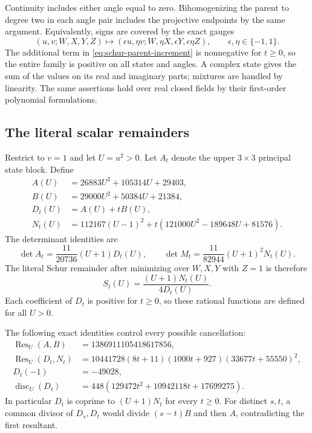 Continuity includes either angle equal to zero. Bihomogenizing the parent
to degree two in each angle pair includes the projective endpoints by the
same argument. Equivalently, signs are covered by the exact gauges
\[
 (u,v;W,X,Y,Z)\longmapsto
 (\epsilon u,\eta v;W,\eta X,\epsilon Y,\epsilon\eta Z),
 \qquad \epsilon,\eta\in\{-1,1\}.
\]
The additional term in \eqref{eq:schur-parent-increment} is nonnegative
for $t\geq0$, so the entire family is positive on all states and angles.
A complex state gives the sum of the values on its real and imaginary
parts; mixtures are handled by linearity. The same assertions hold over
real closed fields by their first-order polynomial formulations.

\subsection{The literal scalar remainders}

Restrict to $v=1$ and let $U=u^2>0$. Let $A_t$ denote the upper
$3\times3$ principal state block. Define
\begin{align*}
 A(U)&=26883U^2+105314U+29403,\\
 B(U)&=29000U^2+50384U+21384,\\
 D_t(U)&=A(U)+tB(U),\\
 N_t(U)&=112167(U-1)^2+t(121000U^2-189648U+81576).
\end{align*}
The determinant identities are
\[
 \det A_t=\frac{11}{20736}(U+1)D_t(U),\qquad
 \det M_t=\frac{11}{82944}(U+1)^2N_t(U).
\]
The literal Schur remainder after minimizing over $W,X,Y$ with $Z=1$
is therefore
\begin{equation}
 S_t(U)=\frac{(U+1)N_t(U)}{4D_t(U)}.
 \label{eq:literal-schur-remainder}
\end{equation}
Each coefficient of $D_t$ is positive for $t\geq0$, so these rational
functions are defined for all $U>0$.

The following exact identities control every possible cancellation:
\begin{align*}
 \operatorname{Res}_U(A,B)&=1386911105418617856,\\
 \operatorname{Res}_U(D_t,N_t)
   &=10441728(8t+11)(1000t+927)(33677t+55550)^2,\\
 D_t(-1)&=-49028,\\
 \operatorname{disc}_U(D_t)
   &=448(129472t^2+10942118t+17699275).
\end{align*}
In particular $D_t$ is coprime to $(U+1)N_t$ for every $t\geq0$.
For distinct $s,t$, a common divisor of $D_s,D_t$ would divide
$(s-t)B$ and then $A$, contradicting the first resultant.

